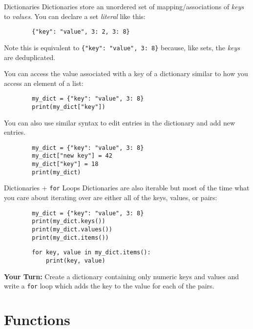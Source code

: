 \documentclass{acm}
\begin{document}
\begin{frame}[fragile]{Dictionaries}
    Dictionaries store an unordered set of mapping/associations of \textit{keys}
    to \textit{values}. You can declare a set \textit{literal} like this:
    \begin{verbatim}
        {"key": "value", 3: 2, 3: 8}
    \end{verbatim}

    Note this is equivalent to \texttt{\{"key": "value", 3: 8\}} because, like
    sets, the \textit{keys} are deduplicated.

    \pause
    You can access the value associated with a key of a dictionary similar to
    how you access an element of a list:
    \begin{verbatim}
        my_dict = {"key": "value", 3: 8}
        print(my_dict["key"])
    \end{verbatim}

    You can also use similar syntax to edit entries in the dictionary and add
    new entries.
    \begin{verbatim}
        my_dict = {"key": "value", 3: 8}
        my_dict["new key"] = 42
        my_dict["key"] = 18
        print(my_dict)
    \end{verbatim}
\end{frame}

\begin{frame}[fragile]{Dictionaries + \texttt{for} Loops}
    Dictionaries are also iterable but most of the time what you care about
    iterating over are either all of the keys, values, or pairs:
    \begin{verbatim}
        my_dict = {"key": "value", 3: 8}
        print(my_dict.keys())
        print(my_dict.values())
        print(my_dict.items())
    \end{verbatim}

    \begin{verbatim}
        for key, value in my_dict.items():
            print(key, value)
    \end{verbatim}

    \pause
    \textbf{Your Turn:} Create a dictionary containing only numeric keys and
    values and write a \texttt{for} loop which adds the key to the value for
    each of the pairs.
\end{frame}

\section{Functions}
\end{document}
